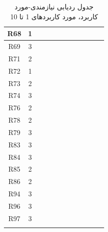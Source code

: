 \documentclass[12pt]{article}
\begin{document}
\begin{longtable}{|c|c|c|c|c|c|c|c|c|c|c|c|}
		\hline
		R68         & 1          &           &           &           &           &           &           &           &           &           &           \\
		\hline
		R69         & 3          &           &           &           &           &           &           &           &           &           &           \\
		\hline
		R71         & 2          &           &           &           &           &           &           &           &           &           &           \\
		\hline
		R72         & 1          &           &           &           &           &           &           &           &           &           &           \\
		\hline
		R73         & 2          &           &           &           &           &           &           &           &           &           &           \\
		\hline
		R74         & 3          &           &           &           &           &           &           &           &           &           &           \\
		\hline
		R76         & 2          &           &           &           &           &           &           &           &           &           &           \\
		\hline
		R78         & 2          &           &           &           &           &           &           &           &           &           &           \\
		\hline
		R79         & 3          &           &           &           &           &           &           &           &           &           &           \\
		\hline
		R83         & 3          &           &           &           &           &           &           &           &           &           &           \\
		\hline
		R84         & 3          &           &           &           &           &           &           &           &           &           &           \\
		\hline
		R85         & 2          &           &           &           &           &           &           &           &           &           &           \\
		\hline
		R86         & 2          &           &           &           &           &           &           &           &           &           &           \\
		\hline
		R94         & 3          &           &           &           &           &           &           &           &           &           &           \\
		\hline
		R96         & 3          &           &           &           &           &           &           &           &           &           &           \\
		\hline
		R97         & 3          &           &           &           &           &           &           &           &           &           &           \\
		\hline
		\caption{جدول ردیابی نیازمندی-مورد کاربرد، مورد کاربردهای 1 تا 10}
	\end{longtable}
\end{document}
